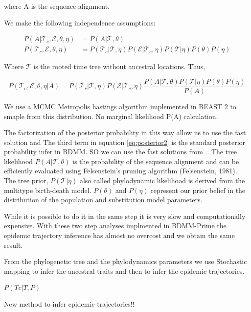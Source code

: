 where A is the sequence alignment.

We make the following independence assumptions:

\begin{align}
P(A | \mathcal{T}_c, \mathcal{E}, \theta, \eta ) &= P(A | \mathcal{T},\theta )\\
P(\mathcal{T}_c, \mathcal{E}, \theta, \eta) &= P(\mathcal{T}_c|\mathcal{T}, \eta) P(\mathcal{E}|\mathcal{T}_c, \eta) P(\mathcal{T} | \eta ) P(\theta) P(\eta)
\label{eq:assumptions}
\end{align}


Where $\mathcal{T}$ is the rooted time tree without ancestral locations. Thus,

\begin{equation}
P(\mathcal{T}_c, \mathcal{E}, \theta, \eta | A) = P(\mathcal{T}_c|\mathcal{T}, \eta) P(\mathcal{E}|\mathcal{T}_c, \eta) \frac{P(A | \mathcal{T}, \theta) P(\mathcal{T} | \eta) P(\theta) P(\eta)}{P(A)}
\label{eq:posterior2}
\end{equation}

We use a MCMC Metropolis hastings algorithm implemented in BEAST 2 to smaple from this distribution. No marginal likelihood P(A) calculation.

The factorization of the posterior probability in this way allow us to use the fast solution and The third term in equation \ref{eq:posterior2} is the standard posterior probability infer in BDMM. SO we can use the fast solutions from ..
{}
The tree likelihood $P(A | \mathcal{T},\theta )$ is the probability of the sequence alignment and can be efficiently evaluated using Felsenstein’s pruning algorithm (Felsenstein, 1981). The tree prior, $P(\mathcal{T} | \eta)$ also called phylodynamic likelihood is derived from the multitype birth-death model. $P(\theta)$ and $P(\eta)$ represent our prior belief in the distribution of the population and substitution model parameters. 

While it is possible to do it in the same step \cite{epiestim} it is very slow and computationally expensive. With these two step analyses implmented in BDMM-Prime \cite{bdmm-primegit} the epidemic trajectory inference has almost no overcost and we obtain the same result.


From the phylogenetic tree and the phylodynamics parameters we use Stochastic mapping to infer the ancestral traits and then to infer the epidemic trajectories.

$P(Tc | T, P)$

New method to infer epidemic trajectories!!

